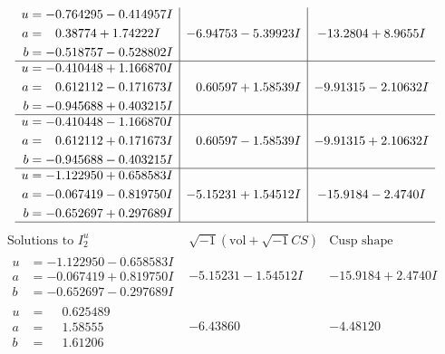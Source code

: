 \documentclass[1p]{elsarticle_modified}
\theoremstyle{definition}
\newcommand{\I}{\sqrt{-1}}
\begin{document}
$$\begin{array}{c|c|c}
\begin{aligned}
u &= -0.764295 - 0.414957 I \\
a &= \phantom{-}0.38774 + 1.74222 I \\
b &= -0.518757 - 0.528802 I\end{aligned}
 & -6.94753 - 5.39923 I & -13.2804 + 8.9655 I \\ \hline\begin{aligned}
u &= -0.410448 + 1.166870 I \\
a &= \phantom{-}0.612112 - 0.171673 I \\
b &= -0.945688 + 0.403215 I\end{aligned}
 & \phantom{-}0.60597 + 1.58539 I & -9.91315 - 2.10632 I \\ \hline\begin{aligned}
u &= -0.410448 - 1.166870 I \\
a &= \phantom{-}0.612112 + 0.171673 I \\
b &= -0.945688 - 0.403215 I\end{aligned}
 & \phantom{-}0.60597 - 1.58539 I & -9.91315 + 2.10632 I \\ \hline\begin{aligned}
u &= -1.122950 + 0.658583 I \\
a &= -0.067419 - 0.819750 I \\
b &= -0.652697 + 0.297689 I\end{aligned}
 & -5.15231 + 1.54512 I & -15.9184 - 2.4740 I\\
 \hline 
 \end{array}$$\newpage$$\begin{array}{c|c|c}  
\text{Solutions to }I^u_{2}& \I (\text{vol} + \sqrt{-1}CS) & \text{Cusp shape}\\
 \hline 
\begin{aligned}
u &= -1.122950 - 0.658583 I \\
a &= -0.067419 + 0.819750 I \\
b &= -0.652697 - 0.297689 I\end{aligned}
 & -5.15231 - 1.54512 I & -15.9184 + 2.4740 I \\ \hline\begin{aligned}
u &= \phantom{-}0.625489\phantom{ +0.000000I} \\
a &= \phantom{-}1.58555\phantom{ +0.000000I} \\
b &= \phantom{-}1.61206\phantom{ +0.000000I}\end{aligned}
 & -6.43860\phantom{ +0.000000I} & -4.48120\phantom{ +0.000000I} \\ \hline\begin{aligned}

\end{aligned}
\end{array}$$
\end{document}
